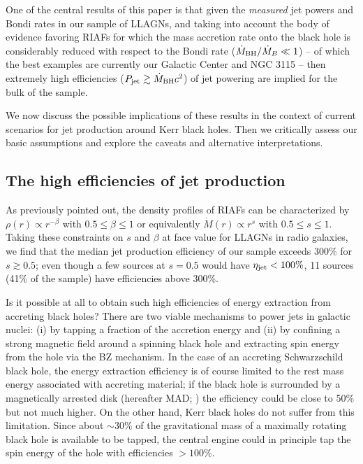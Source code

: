 \documentclass[useAMS,usenatbib]{mn2e}
\begin{document}
One of the central results of this paper is that given the \emph{measured} jet powers and Bondi rates in our sample of LLAGNs, and taking into account the body of evidence favoring RIAFs for which the mass accretion rate onto the black hole is considerably reduced with respect to the Bondi rate ($\dot{M}_{\rm BH}/\dot{M}_B \ll 1$) -- of which the best examples are currently our Galactic Center and NGC 3115 -- then extremely high efficiencies ($P_{\rm jet} \gtrsim \dot{M}_{\rm BH} c^2$) of jet powering are implied for the bulk of the sample. 

We now discuss the possible implications of these results in the context of current scenarios for jet production around Kerr black holes. Then we critically assess our basic assumptions and explore the caveats and alternative interpretations.

\subsection{The high efficiencies of jet production}

As previously pointed out, the density profiles of RIAFs can be characterized by $\rho(r) \propto r^{-\beta}$ with $0.5 \leq \beta \leq 1$ or equivalently $\dot{M}(r) \propto r^s$ with $0.5 \leq s \leq 1$. 
Taking these constraints on $s$ and $\beta$ at face value for LLAGNs in radio galaxies, we find that the median jet production efficiency of our sample exceeds 300\% for $s \gtrsim 0.5$; even though a few sources at $s=0.5$ would have $\eta_{\rm jet} < 100\%$, 11 sources (41\% of the sample) have efficiencies above 300\%. 

Is it possible at all to obtain such high efficiencies of energy extraction from accreting black holes? There are two viable mechanisms to power jets in galactic nuclei:  (i) by tapping a fraction of the accretion energy and (ii) by confining a strong magnetic field around a spinning black hole and extracting spin energy from the hole via the BZ mechanism. In the case of an accreting Schwarzschild black hole, the energy extraction efficiency is of course limited to the rest mass energy associated with accreting material; if the black hole is surrounded by a magnetically arrested disk (hereafter MAD; \citealt{Bisnovatyi-Kogan74,Narayan03}) the efficiency could be close to 50\% but not much higher. On the other hand, Kerr black holes do not suffer from this limitation. Since about $\sim 30\%$ of the gravitational mass of a maximally rotating black hole is available to be tapped, the central engine could in principle tap the spin energy of the hole with efficiencies $>100\%$. 
\end{document}
